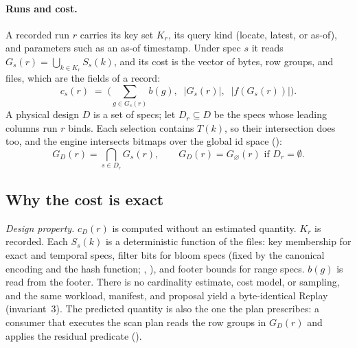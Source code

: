 \paragraph{Runs and cost.} A recorded run $r$ carries its key set $K_r$, its
query kind (locate, latest, or as-of), and parameters such as an as-of
timestamp. Under spec $s$ it reads $G_s(r) = \bigcup_{k \in K_r} S_s(k)$, and
its cost is the vector of bytes, row groups, and files, which are the fields of
a  record:
\begin{equation}\label{eq:cost}
  c_s(r) \;=\; \Big( \textstyle\sum_{g \in G_s(r)} b(g),\;\; |G_s(r)|,\;\;
  |f(G_s(r))| \Big).
\end{equation}
A physical design $D$ is a set of specs; let $D_r \subseteq D$ be the specs
whose leading columns run $r$ binds. Each selection contains $T(k)$, so their
intersection does too, and the engine intersects bitmaps over the global id
space ():
\begin{equation}\label{eq:design}
  G_D(r) = \textstyle\bigcap_{s \in D_r} G_s(r), \qquad
  G_D(r) = G_\varnothing(r) \text{ if } D_r = \emptyset .
\end{equation}

\subsection{Why the cost is exact}\label{sec:exact}

\emph{Design property.} $c_D(r)$ is computed without an estimated quantity.
$K_r$ is recorded. Each $S_s(k)$ is a deterministic function of the files: key
membership for exact and temporal specs, filter bits for bloom specs (fixed by
the canonical encoding and the hash function; , ), and footer
bounds for range specs. $b(g)$ is read from the footer. There is no cardinality
estimate, cost model, or sampling, and the same workload, manifest, and
proposal yield a byte-identical Replay (invariant~3). The predicted quantity is
also the one the plan prescribes: a consumer that executes the scan plan reads
the row groups in $G_D(r)$ and applies the residual predicate ().

